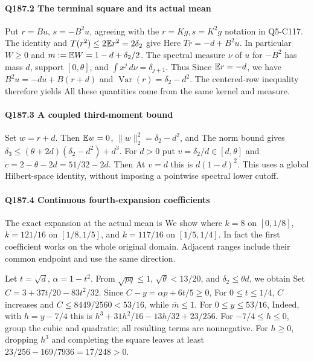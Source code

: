 \paragraph{Q187.2 The terminal square and its actual mean}
Put $r=Bu$, $s=-B^2u$, agreeing with the $r=Kg,s=K^2g$
notation in Q5-C117. The identity
and $T(r^2)\le2\mathbb E r^2=2\delta_2$ give
Here $Tr=-d+B^2u$. In particular $W\ge0$ and
$m:=\mathbb E W=1-d+\delta_2/2$. The spectral measure $\nu$ of $u$
for $-B^2$ has mass $d$, support $[0,\theta]$, and
$\int x^j\,d\nu=\delta_{j+1}$. Thus
Since $\mathbb E r=-d$, we have $B^2u=-du+B(r+d)$ and
$\operatorname{Var}(r)=\delta_2-d^2$. The centered-row inequality
therefore yields
All these quantities come from the same kernel and measure.

\paragraph{Q187.3 A coupled third-moment bound}
Set $w=r+d$. Then $\mathbb E w=0$, $\|w\|_2^2=\delta_2-d^2$, and
The norm bound gives
$\delta_3\le(\theta+2d)(\delta_2-d^2)+d^3$.
For $d>0$ put $v=\delta_2/d\in[d,\theta]$ and
$c=2-\theta-2d=51/32-2d$. Then
At $v=d$ this is $d(1-d)^2$. This uses a global Hilbert-space
identity, without imposing a pointwise spectral lower cutoff.

\paragraph{Q187.4 Continuous fourth-expansion coefficients}
The exact expansion at the actual mean is
We show
where $k=8$ on $[0,1/8]$, $k=121/16$ on $[1/8,1/5]$,
and $k=117/16$ on $[1/5,1/4]$. In fact the first coefficient
works on the whole original domain. Adjacent ranges include their
common endpoint and use the same direction.

Let $t=\sqrt d$, $\alpha=1-t^2$. From $\sqrt{pq}\le1$,
$\sqrt\theta<13/20$, and $\delta_2\le\theta d$, we obtain
Set $C=3+37t/20-83t^2/32$. Since
$C-y=\alpha p+6t/5\ge0$,
For $0\le t\le1/4$, $C$ increases and
$C\le8449/2560<53/16$, while $\overline m\le1$. For
$0\le y\le53/16$,
Indeed, with $h=y-7/4$ this is
$h^3+31h^2/16-13h/32+23/256$.
For $-7/4\le h\le0$, group the cubic and quadratic; all resulting
terms are nonnegative. For $h\ge0$, dropping $h^3$ and completing
the square leaves at least $23/256-169/7936=17/248>0$.

